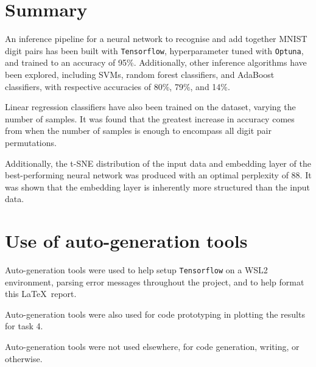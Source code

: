 \documentclass[11pt,a4paper]{article}
\begin{document}
\section{Summary}
An inference pipeline for a neural network to recognise and add together MNIST digit pairs has been built with \texttt{Tensorflow}, hyperparameter tuned with \texttt{Optuna}, and trained to an accuracy of 95\%. Additionally, other inference algorithms have been explored, including SVMs, random forest classifiers, and AdaBoost classifiers, with respective accuracies of 80\%, 79\%, and 14\%. 

Linear regression classifiers have also been trained on the dataset, varying the number of samples. It was found that the greatest increase in accuracy comes from when the number of samples is enough to encompass all digit pair permutations.

Additionally, the t-SNE distribution of the input data and embedding layer of the best-performing neural network was produced with an optimal perplexity of 88. It was shown that the embedding layer is inherently more structured than the input data.
\clearpage


\appendix
\section{Use of auto-generation tools}
Auto-generation tools were used to help setup \texttt{Tensorflow} on a WSL2 environment, parsing error messages throughout the project, and to help format this \LaTeX\ report.

Auto-generation tools were also used for code prototyping in plotting the results for task 4. 

Auto-generation tools were not used elsewhere, for code generation, writing, or otherwise.
\end{document}
